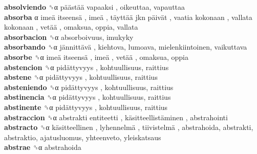 \textbf{absolviendo} ␝α   päästää vapaaksi , oikeuttaa, vapauttaa  \\
\textbf{absorba} α   imeä itseensä ,  imeä ,  täyttää jkn päivät ,  vaatia kokonaan ,  vallata kokonaan ,  vetää , omaksua, oppia, vallata  \\
\textbf{absorbacion} ␝α  absorboivuus, imukyky  \\
\textbf{absorbando} ␝α   jännittävä , kiehtova, lumoava, mielenkiintoinen, vaikuttava  \\
\textbf{absorbe} ␝α   imeä itseensä ,  imeä ,  vetää , omaksua, oppia  \\
\textbf{abstencion} ␝α   pidättyvyys , kohtuullisuus, raittius  \\
\textbf{abstene} ␝α   pidättyvyys , kohtuullisuus, raittius  \\
\textbf{absteniendo} ␝α   pidättyvyys , kohtuullisuus, raittius  \\
\textbf{abstinencia} ␝α   pidättyvyys , kohtuullisuus, raittius  \\
\textbf{abstinente} ␝α   pidättyvyys , kohtuullisuus, raittius  \\
\textbf{abstraccion} ␝α   abstrakti entiteetti ,  käsitteellistäminen , abstrahointi  \\
\textbf{abstracto} ␝α   käsitteellinen ,  lyhennelmä ,  tiivistelmä , abstrahoida, abstrakti, abstraktio, ajatusluomus, yhteenveto, yleiskatsaus  \\
\textbf{abstrae} ␝α  abstrahoida  \\
